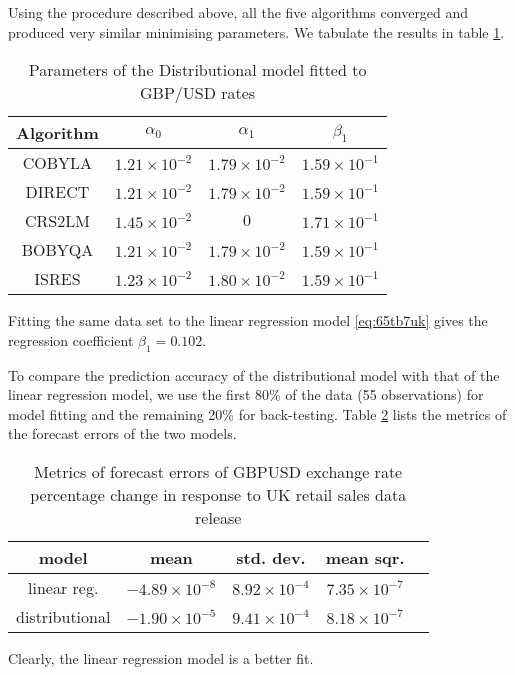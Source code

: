\documentclass[a4paper,11pt,pdftex,twoside,titlepage]{article}
\begin{document}
Using the procedure described above, all the five algorithms converged
and produced very similar minimising parameters. We tabulate the
results in table \ref{tab:gbpusd}.
\begin{table}[htb!]
  \centering
  \begin{tabular}{c|c|c|c}
    Algorithm & $\alpha_0$ & $\alpha_1$ & $\beta_1$ \\
    \hline
    COBYLA & $1.21 \times 10^{-2}$ & $1.79 \times 10^{-2}$ & $1.59 \times 10^{-1}$ \\
    DIRECT & $1.21 \times 10^{-2}$ & $1.79 \times 10^{-2}$ & $1.59 \times 10^{-1}$ \\
    CRS2LM & $1.45 \times 10^{-2}$ & $0$ & $1.71 \times 10^{-1}$ \\
    BOBYQA & $1.21 \times 10^{-2}$ & $1.79 \times 10^{-2}$ & $1.59 \times 10^{-1}$ \\
    ISRES & $1.23 \times 10^{-2}$ & $1.80 \times 10^{-2}$ & $1.59 \times 10^{-1}$ \\
    \hline
  \end{tabular}
  \caption{Parameters of the Distributional model fitted to GBP/USD
    rates}
  \label{tab:gbpusd}
\end{table}
Fitting the same data set to the linear regression model
\eqref{eq:65tb7uk} gives the regression coefficient $\beta_1 = 0.102$.

To compare the prediction accuracy of the distributional model with
that of the linear regression model, we use the first 80\% of the data
(55 observations) for model fitting and the remaining 20\% for
back-testing. Table \ref{tab:t56y67} lists the metrics of the forecast
errors of the two models.
\begin{table}[htb!]
  \centering
  \begin{tabular}{c|c|c|c|c}
    model & mean & std. dev. & mean sqr. \\
    \hline
    linear reg. & $-4.89 \times 10^{-8}$ & $8.92 \times 10^{-4}$ & $7.35 \times 10^{-7}$ \\
    distributional & $-1.90 \times 10^{-5}$ & $9.41 \times 10^{-4}$ & $8.18 \times 10^{-7}$ \\
    \hline
  \end{tabular}
  \caption{Metrics of forecast errors of GBPUSD exchange rate
    percentage change in response to UK retail sales data 
    release}
  \label{tab:t56y67}
\end{table}
Clearly, the linear regression model is a better fit.


\end{document}
